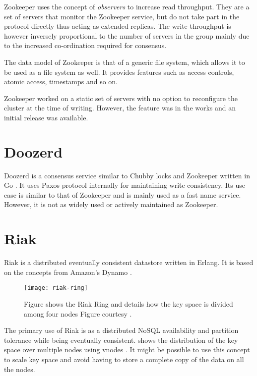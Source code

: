 Zookeeper uses the concept of \emph{observers} to increase read throughput. They
are a set of servers that monitor the Zookeeper service, but do not take part
in the protocol directly thus acting as extended replicas. The write throughput
is however inversely proportional to the number of servers in the group mainly
due to the increased co-ordination required for consensus.

The data model of Zookeeper is that of a generic file system, which allows it
to be used as a file system as well. It provides features such as access
controls, atomic access, timestamps and so on.

Zookeeper worked on a static set of servers with no option to reconfigure the
cluster at the time of writing. However, the feature was in the works
\citep{zab2012} and an initial release was available.

\section{Doozerd}

Doozerd \citep{doozerd} is a consensus service similar to Chubby locks
 and Zookeeper  written in
Go \citep{golang}. It uses Paxos protocol internally for maintaining
write consistency. Its use case is similar to that of Zookeeper and is
mainly used as a fast name service. However, it is not as widely used
or actively maintained as Zookeeper.

\section{Riak}

Riak \citep{riak} is a distributed eventually consistent datastore written in
Erlang. It is based on the concepts from Amazon's Dynamo \citep{DeCandia07}.

\begin{figure}
  \texttt{[image: riak-ring]}
  \caption[Riak Ring]{%
    Figure shows the Riak Ring and details how the key space is divided among
    four nodes
    Figure courtesy \citet{riak}.}
  \label{figure:riak.ring}
\end{figure}

The primary use of Riak is as a distributed NoSQL%
availability and partition tolerance while
being eventually consistent.  shows the distribution of the
key space over multiple nodes using vnodes%
. It might be possible to use this concept to scale key space and avoid having
to store a complete copy of the data on all the nodes.

